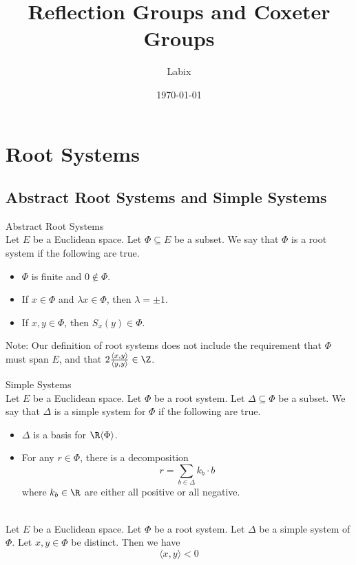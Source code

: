 \documentclass[a4paper]{article}
\title{Reflection Groups and Coxeter Groups}
\author{Labix}
\date{\today}
\begin{document}
\maketitle

\pagebreak
\tableofcontents

\pagebreak
\section{Root Systems}
\subsection{Abstract Root Systems and Simple Systems}
\begin{defn}{Abstract Root Systems}{}\\
Let $E$ be a Euclidean space. Let $\Phi\subseteq E$ be a subset. We say that $\Phi$ is a root system if the following are true. 
\begin{itemize}
\item $\Phi$ is finite and $0\notin\Phi$. 
\item If $x\in\Phi$ and $\lambda x\in\Phi$, then $\lambda=\pm1$. 
\item If $x,y\in\Phi$, then $S_x(y)\in\Phi$. 
\end{itemize}
\end{defn}

Note: Our definition of root systems does not include the requirement that $\Phi$ must span $E$, and that $2\frac{\langle x,y\rangle}{\langle y,y\rangle}\in\Z$. 

\begin{defn}{Simple Systems}{}\\
Let $E$ be a Euclidean space. Let $\Phi$ be a root system. Let $\Delta\subseteq\Phi$ be a subset. We say that $\Delta$ is a simple system for $\Phi$ if the following are true. 
\begin{itemize}
\item $\Delta$ is a basis for $\R\langle\Phi\rangle$. 
\item For any $r\in\Phi$, there is a decomposition $$r=\sum_{b\in\Delta}k_b\cdot b$$ where $k_b\in\R$ are either all positive or all negative. 
\end{itemize}
\end{defn}

\begin{lmm}{}{}\\
Let $E$ be a Euclidean space. Let $\Phi$ be a root system. Let $\Delta$ be a simple system of $\Phi$. Let $x,y\in\Phi$ be distinct. Then we have $$\langle x,y\rangle<0$$
\end{lmm}
\end{document}
